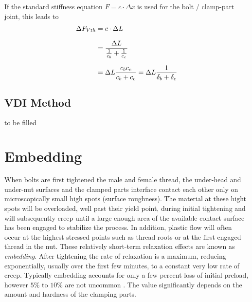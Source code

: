 If the standard stiffness equation $F=c \cdot \Delta x$ is used for the bolt / clamp-part joint, this leads to
\begin{subequations}
  \setlength{\jot}{10pt}
  \begin{align}
    \Delta F_{Vth} &= c \cdot \Delta L \\
    &= \frac{\Delta L}{\frac{1}{c_b}+\frac{1}{c_c}} \\
    &= \Delta L \frac{c_b c_c}{c_b + c_c} = \Delta L \frac{1}{\delta_b + \delta_c}
    \label{equ:dFVth}
  \end{align}
\end{subequations}

\subsection{VDI Method}
to be filled

\section{Embedding}
\label{sec:embedding}
When bolts are first tightened the male and female thread, the under-head and under-nut surfaces and the 
clamped parts interface contact each other only on microscopically small high spots (surface roughness).
The material at these hight spots will be overloaded, well past their yield point, during initial 
tightening and will subsequently creep until a large enough area of the available contact surface has 
been engaged to stabilize the process. In addition, plastic flow will often occur at the highest stressed 
points such as thread roots or at the first engaged thread in the nut. These relatively short-term 
relaxation effects are known as \emph{embedding}. After tightening the rate of relaxation is a maximum, 
reducing exponentially, usually over the first few minutes, to a constant very low rate of creep. 
Typically embedding accounts for only a few percent loss of initial preload, however $5\%$ to $10\%$ are
not uncommon \cite{ECSS_HB_32_23A}. The value significantly depends on the amount and hardness of the 
clamping parts. 

